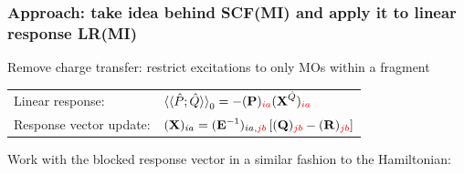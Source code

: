 \documentclass[%
    xcolor=usenames,dvipsnames,svgnames%
]{beamer}
\begin{document}
\begin{frame}
  \frametitle{Approach: take idea behind SCF(MI) and apply it to linear response \textrightarrow{} \textcolor{AlertColor}{LR(MI)}}
  Remove charge transfer: restrict excitations to only MOs within a fragment
  \begin{table}
    \centering
    \begin{tabular}{ll}
      Linear response: & \(\braket{\braket{\hat{P};\hat{Q}}}_{0} = -(\boldsymbol{\mathbf{P}})_{\textcolor{red}{ia}}(\boldsymbol{\mathbf{X}}^{\hat{Q}})_{\textcolor{red}{ia}}\) \\
      Response vector update: & \((\boldsymbol{\mathbf{X}})_{ia} = (\boldsymbol{\mathbf{E}}^{-1})_{ia,\textcolor{red}{jb}} \left[ (\boldsymbol{\mathbf{Q}})_{\textcolor{red}{jb}} - (\boldsymbol{\mathbf{R}})_{\textcolor{red}{jb}} \right]\)
    \end{tabular}
  \end{table}
  Work with the blocked response vector in a similar fashion to the Hamiltonian:
  \begin{table}
    \centering
    \begin{tabular}{ccc}

\end{tabular}
\end{table}
\end{frame}
\end{document}

